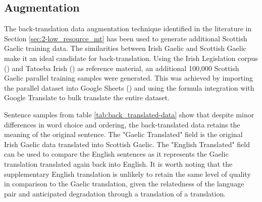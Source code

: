 \subsection{Augmentation}

The back-translation data augmentation technique identified in the literature in Section \ref{sec:2-low_resource_mt} has been used to generate additional Scottish Gaelic training data. The similarities between Irish Gaelic and Scottish Gaelic make it an ideal candidate for back-translation. Using the Irish Legislation corpus (\cite{irish_corpus_2017}) and Tatoeba Irish (\cite{tiedemann_opus_2012}) as reference material, an additional 100,000 Scottish Gaelic parallel training samples were generated. This was achieved by importing the parallel dataset into Google Sheets (\cite{google_sheets_2020}) and using the formula integration with Google Translate to bulk translate the entire dataset.



Sentence samples from table \ref{tab:back_translated-data} show that despite minor differences in word choice and ordering, the back-translated data retains the meaning of the original sentence. The "Gaelic Translated" field is the original Irish Gaelic data translated into Scottish Gaelic. The "English Translated" field can be used to compare the English sentences as it represents the Gaelic translation translated again back into English. It is worth noting that the supplementary English translation is unlikely to retain the same level of quality in comparison to the Gaelic translation, given the relatedness of the language pair and anticipated degradation through a translation of a translation.

